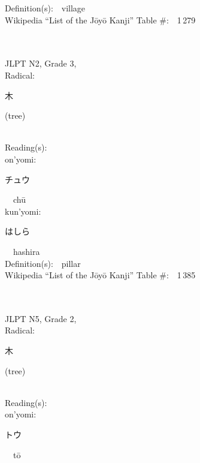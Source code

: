 \begin{multicols}{2}
Definition(s):\ \ village \\
Wikipedia ``List of the J\=oy\=o Kanji'' Table \#:\ \ 1\,279 \\
\ \ \\
{\fontsize{34pt}{40pt}  }\ \ \\  %
{JLPT N2, Grade 3, \\Radical:\ \ {\begin{CJK}{UTF8}{min} 木 \end{CJK}} (tree) } \\
Reading(s):\ \ \\
{\hspace*{1em}}on'yomi:\ \ \\
{\hspace*{2em}}{\begin{CJK}{UTF8}{min} チュウ \end{CJK}}\ \ ch\=u\ \ \\
{\hspace*{1em}}kun'yomi:\ \ \\
{\hspace*{2em}}{\begin{CJK}{UTF8}{min} はしら \end{CJK}}\ \ hashira\ \ \\
Definition(s):\ \ pillar \\
Wikipedia ``List of the J\=oy\=o Kanji'' Table \#:\ \ 1\,385 \\
\ \ \\
{\fontsize{34pt}{40pt}  }\ \ \\  %
{JLPT N5, Grade 2, \\Radical:\ \ {\begin{CJK}{UTF8}{min} 木 \end{CJK}} (tree) } \\
Reading(s):\ \ \\
{\hspace*{1em}}on'yomi:\ \ \\
{\hspace*{2em}}{\begin{CJK}{UTF8}{min} トウ \end{CJK}}\ \ t\=o\ \ \\

\end{multicols}
